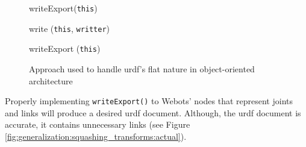 \begin{figure}[H]
    \begin{minipage}{\linewidth}
    \begin{procedure}[H]
    
        
        
        writeExport(\texttt{this}) \;
        
        \caption{write (\texttt{this}, \texttt{writter})}
    \end{procedure}
    \end{minipage}
    \begin{minipage}{\linewidth}
    \begin{procedure}[H]
        \caption{writeExport (\texttt{this})}
    \end{procedure}
    \end{minipage}
\caption{Approach used to handle \ac{urdf}'s flat nature in object-oriented architecture}
\label{fig:generalization:urdf_flat}
\end{figure}

Properly implementing \texttt{writeExport()} to Webots' nodes that represent joints and links will produce a desired \ac{urdf} document.
Although, the \ac{urdf} document is accurate, it contains unnecessary links (see Figure \ref{fig:generalization:squashing_transforms:actual}).

